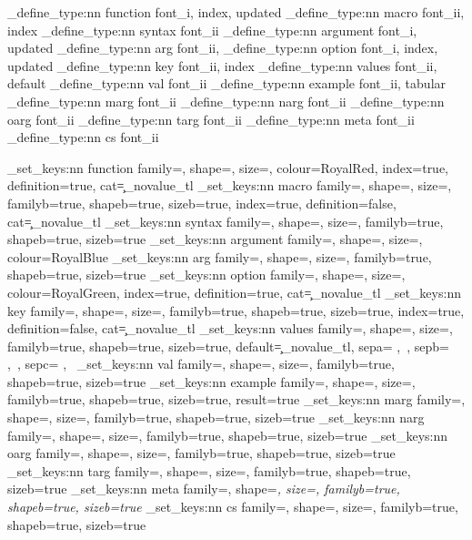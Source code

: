 	
	\mydoc_define_type:nn { function } { font_i, index, updated }
	\mydoc_define_type:nn { macro    } { font_ii, index   }
	\mydoc_define_type:nn { syntax   } { font_ii          }
	\mydoc_define_type:nn { argument } { font_i, updated  }
	\mydoc_define_type:nn { arg      } { font_ii,         }
	\mydoc_define_type:nn { option   } { font_i, index, updated }
	\mydoc_define_type:nn { key      } { font_ii, index   }
	\mydoc_define_type:nn { values   } { font_ii, default }
	\mydoc_define_type:nn { val      } { font_ii          }
	\mydoc_define_type:nn { example  } { font_ii, tabular }
	\mydoc_define_type:nn { marg     } { font_ii          }
	\mydoc_define_type:nn { narg     } { font_ii          }
	\mydoc_define_type:nn { oarg     } { font_ii          }
	\mydoc_define_type:nn { targ     } { font_ii          }
	\mydoc_define_type:nn { meta     } { font_ii          }
	\mydoc_define_type:nn { cs       } { font_ii          }
	
	\mydoc_set_keys:nn { function } { family=\ttfamily, shape=\upshape, size=\small, colour=RoyalRed, index=true, definition=true, cat=\c_novalue_tl }
	\mydoc_set_keys:nn { macro    } { family=\ttfamily, shape=\upshape, size=\small, familyb=true, shapeb=true, sizeb=true, index=true, definition=false, cat=\c_novalue_tl }
	\mydoc_set_keys:nn { syntax   } { family=\rmfamily, shape=\upshape, size=\small, familyb=true, shapeb=true, sizeb=true }
	\mydoc_set_keys:nn { argument } { family=\rmfamily, shape=\upshape, size=\small, colour=RoyalBlue }
	\mydoc_set_keys:nn { arg      } { family=\rmfamily, shape=\upshape, size=\small, familyb=true, shapeb=true, sizeb=true }
	\mydoc_set_keys:nn { option   } { family=\ttfamily, shape=\upshape, size=\small, colour=RoyalGreen, index=true, definition=true, cat=\c_novalue_tl }
	\mydoc_set_keys:nn { key      } { family=\ttfamily, shape=\upshape, size=\small, familyb=true, shapeb=true, sizeb=true, index=true, definition=false, cat=\c_novalue_tl }
	\mydoc_set_keys:nn { values   } { family=\ttfamily, shape=\upshape, size=\small, familyb=true, shapeb=true, sizeb=true, default=\c_novalue_tl, sepa={ ,~}, sepb={ ,~}, sepc={ ,~} }
	\mydoc_set_keys:nn { val      } { family=\ttfamily, shape=\upshape, size=\small, familyb=true, shapeb=true, sizeb=true }
	\mydoc_set_keys:nn { example  } { family=\ttfamily, shape=\upshape, size=\small, familyb=true, shapeb=true, sizeb=true, result=true }
	\mydoc_set_keys:nn { marg     } { family=\ttfamily, shape=\upshape, size=\small, familyb=true, shapeb=true, sizeb=true }
	\mydoc_set_keys:nn { narg     } { family=\ttfamily, shape=\upshape, size=\small, familyb=true, shapeb=true, sizeb=true }
	\mydoc_set_keys:nn { oarg     } { family=\ttfamily, shape=\upshape, size=\small, familyb=true, shapeb=true, sizeb=true }
	\mydoc_set_keys:nn { targ     } { family=\ttfamily, shape=\upshape, size=\small, familyb=true, shapeb=true, sizeb=true }
	\mydoc_set_keys:nn { meta     } { family=\rmfamily, shape=\slshape, size=\small, familyb=true, shapeb=true, sizeb=true }
	\mydoc_set_keys:nn { cs       } { family=\rmfamily, shape=\upshape, size=\small, familyb=true, shapeb=true, sizeb=true }
	
